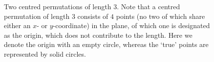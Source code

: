 \documentclass[11pt,a4paper]{article}
\newcommand{\plotptradius}{4pt}
\theoremstyle{definition}
\begin{document}
\begin{figure}[h]
\begin{center}
\end{center}
\caption{Two centred permutations of length $3$. Note that a centred permutation of length $3$ consists of $4$ points (no two of which share either an $x$- or $y$-coordinate) in the plane, of which one is designated as the origin, which does not contribute to the length. Here we denote the origin with an empty circle, whereas the `true' points are represented by solid circles.}
\label{fig:centred0}
\end{figure}
\end{document}
